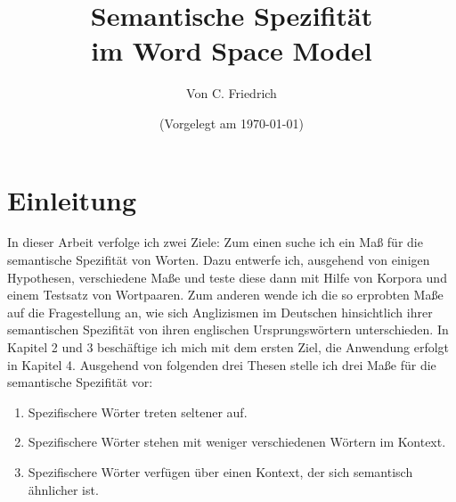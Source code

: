\documentclass[11pt,numbers=noenddot]{scrartcl}
\title{Semantische Spezifität \\im Word Space Model}
\author{Von C. Friedrich}
\date{(Vorgelegt am \today)}
\begin{document}
\begin{titlepage}
\maketitle


\thispagestyle{empty}
\end{titlepage}

\tableofcontents
\newpage

\section{Einleitung}

In dieser Arbeit verfolge ich zwei Ziele: Zum einen suche ich ein Maß für die semantische Spezifität von Worten. Dazu entwerfe ich, ausgehend von einigen Hypothesen, verschiedene Maße und teste diese dann mit Hilfe von Korpora und einem Testsatz von Wortpaaren. Zum anderen wende ich die so erprobten Maße auf die Fragestellung an, wie sich Anglizismen im Deutschen hinsichtlich ihrer semantischen Spezifität von ihren englischen Ursprungswörtern unterschieden. In Kapitel 2 und 3 beschäftige ich mich mit dem ersten Ziel, die Anwendung erfolgt in Kapitel 4. Ausgehend von folgenden drei Thesen stelle ich drei Maße für die semantische Spezifität vor:
\begin{enumerate}
    \item Spezifischere Wörter treten seltener auf.
    \item Spezifischere Wörter stehen mit weniger verschiedenen Wörtern im Kontext.
    \item Spezifischere Wörter verfügen über einen Kontext, der sich semantisch ähnlicher ist.
\end{enumerate}
\end{document}
